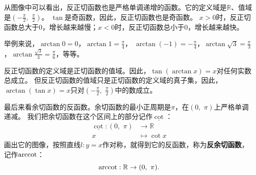 \documentclass[12pt,UTF8]{ctexbook}
\begin{document}
从图像中可以看出，反正切函数也是严格单调递增的函数。它的定义域是$\mathbb{R}$、值域是$(-\frac{\pi}{2}, \,\, \frac{\pi}{2})$。
$\underline{\tan}$是奇函数，因此，反正切函数也是奇函数。
$x > 0$时，反正切函数总大于$0$，增长越来越慢；$x < 0$时，反正切函数总小于$0$，增长越来越快。

举例来说，$\arctan{0} = 0$，$\arctan{1} = \frac{\pi}{4}$，
$\arctan{(-1)} = -\frac{\pi}{4}$，$\arctan{\sqrt{3}} = \frac{\pi}{3}$，$\arctan{\frac{\sqrt{3}}{3}} = \frac{\pi}{6}$，等等。

反正切函数的定义域是正切函数的值域。因此，$\tan{(\arctan{x})} = x$对任何实数总成立。
但反正切函数的值域只是正切函数的定义域的真子集，因此，$\arctan{(\tan{x})} = x$只对$(-\frac{\pi}{2}, \,\, \frac{\pi}{2})$中的数成立。

最后来看余切函数的反函数。余切函数的最小正周期是$\pi$，在$(0, \,\, \pi)$上严格单调递减。
我们把余切函数在这个区间上的部分记作$\underline{\cot}$：
\begin{align*}
    \underline{\cot} : (0, \,\, \pi) &\rightarrow \mathbb{R}  \\
                                   x &\mapsto \cot{x} 
\end{align*}
画出它的图像，按照直线$l: y = x$作对称，就得到它的反函数，称为\textbf{反余切函数}，记作$\operatorname{arccot}$：
$$ \operatorname{arccot} : \mathbb{R} \rightarrow (0, \,\, \pi) . $$
\end{document}
